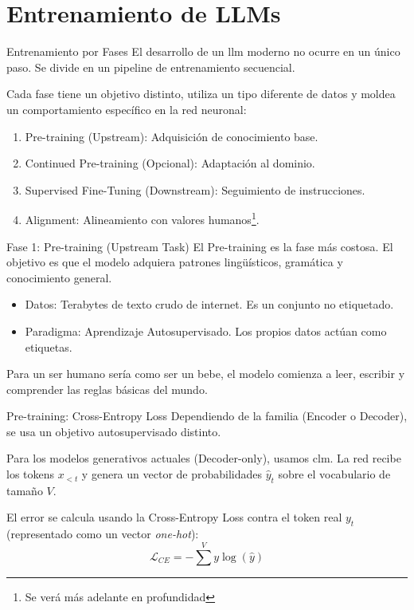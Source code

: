 \section{Entrenamiento de LLMs}

\begin{frame}{Entrenamiento por Fases}
El desarrollo de un \gls{llm} moderno no ocurre en un único paso. Se divide en un \alert{pipeline de entrenamiento secuencial}.

Cada fase tiene un objetivo distinto, utiliza un tipo diferente de datos y moldea un comportamiento específico en la red neuronal:
\begin{enumerate}
    \item \alert{Pre-training (Upstream):} Adquisición de conocimiento base.
    \item \alert{Continued Pre-training (Opcional):} Adaptación al dominio.
    \item \alert{Supervised Fine-Tuning (Downstream):} Seguimiento de instrucciones.
    \item \alert{Alignment:} Alineamiento con valores humanos\footnote{Se verá más adelante en profundidad}.
\end{enumerate}
\end{frame}

\begin{frame}{Fase 1: Pre-training (Upstream Task)}
El \alert{Pre-training} es la fase \alert{más costosa}. El objetivo es que el modelo adquiera \alert{patrones} lingüísticos, gramática y conocimiento general.

\begin{itemize}
    \item \alert{Datos:} Terabytes de texto crudo de internet. Es un conjunto \alert{no etiquetado}.
    \item \alert{Paradigma:} Aprendizaje \alert{Autosupervisado}. Los propios datos actúan como etiquetas.
\end{itemize}

Para un ser humano sería como ser un bebe, el modelo comienza a leer, escribir y comprender las reglas básicas del mundo.
\end{frame}

\begin{frame}{Pre-training: Cross-Entropy Loss}
Dependiendo de la familia (Encoder o Decoder), se usa un objetivo autosupervisado distinto. 

Para los modelos generativos actuales (\alert{Decoder-only}), usamos \alert{\acrfull{clm}}. La red recibe los tokens $x_{<t}$ y genera un vector de probabilidades $\hat{y}_t$ sobre el vocabulario de tamaño $V$. 

El error se calcula usando la \alert{Cross-Entropy Loss} contra el token real $y_t$ (representado como un vector \textit{one-hot}):
\begin{equation}
\mathcal{L}_{CE} = - \sum^{V} y \log(\hat{y})
\end{equation}
\end{frame}

